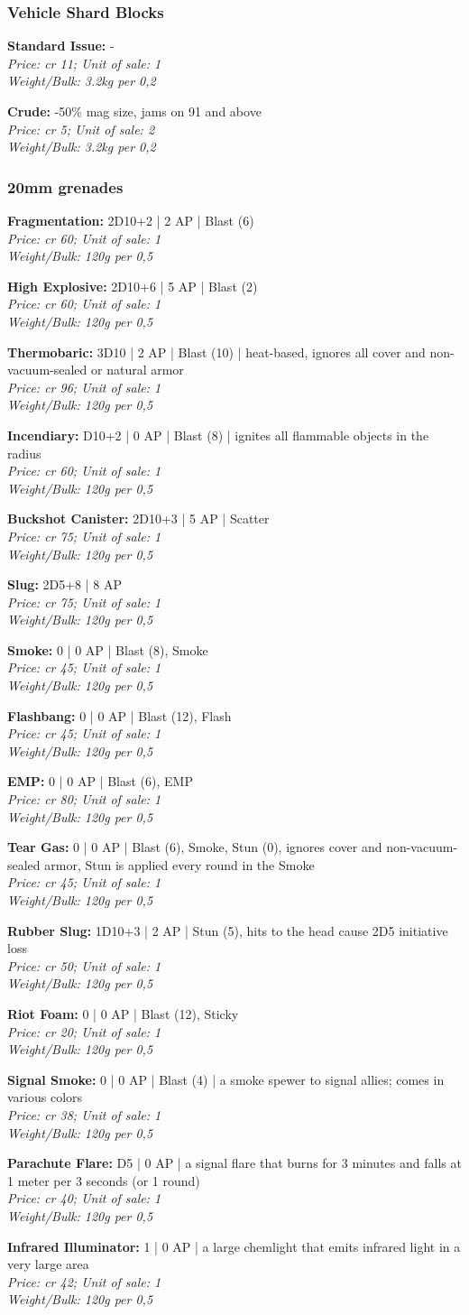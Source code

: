 \documentclass[12pt,a4paper,openany]{book}
\newcommand{\ammo}[6]{
	\begin{minipage}{\textwidth}
		\textbf{#1:} #2\\
		\textit{Price: #3; Unit of sale: #4}\\
		\textit{Weight/Bulk: #5 per #6}
	\end{minipage}
	\par
}
\begin{document}
	\subsubsection{Vehicle Shard Blocks}
	\ammo{Standard Issue}{-}{cr 11}{1}{3.2kg}{0,2}
	\ammo{Crude}{-50\% mag size, jams on 91 and above}{cr 5}{2}{3.2kg}{0,2}
	
	\subsubsection{20mm grenades}
	\ammo{Fragmentation}{2D10+2 | 2 AP | Blast (6)}{cr 60}{1}{120g}{0,5}
	\ammo{High Explosive}{2D10+6 | 5 AP | Blast (2)}{cr 60}{1}{120g}{0,5}
	\ammo{Thermobaric}{3D10 | 2 AP | Blast (10) | heat-based, ignores all cover and non-vacuum-sealed or natural armor}{cr 96}{1}{120g}{0,5}
	\ammo{Incendiary}{D10+2 | 0 AP | Blast (8) | ignites all flammable objects in the radius}{cr 60}{1}{120g}{0,5}
	\ammo{Buckshot Canister}{2D10+3 | 5 AP | Scatter}{cr 75}{1}{120g}{0,5}
	\ammo{Slug}{2D5+8 | 8 AP}{cr 75}{1}{120g}{0,5}
	\ammo{Smoke}{0 | 0 AP | Blast (8), Smoke}{cr 45}{1}{120g}{0,5}
	\ammo{Flashbang}{0 | 0 AP | Blast (12), Flash}{cr 45}{1}{120g}{0,5}
	\ammo{EMP}{0 | 0 AP | Blast (6), EMP}{cr 80}{1}{120g}{0,5}
	\ammo{Tear Gas}{0 | 0 AP | Blast (6), Smoke, Stun (0), ignores cover and non-vacuum-sealed armor, Stun is applied every round in the Smoke}{cr 45}{1}{120g}{0,5}
	\ammo{Rubber Slug}{1D10+3 | 2 AP | Stun (5), hits to the head cause 2D5 initiative loss}{cr 50}{1}{120g}{0,5}
	\ammo{Riot Foam}{0 | 0 AP | Blast (12), Sticky}{cr 20}{1}{120g}{0,5}
	\ammo{Signal Smoke}{0 | 0 AP | Blast (4) | a smoke spewer to signal allies; comes in various colors}{cr 38}{1}{120g}{0,5}
	\ammo{Parachute Flare}{D5 | 0 AP | a signal flare that burns for 3 minutes and falls at 1 meter per 3 seconds (or 1 round)}{cr 40}{1}{120g}{0,5}
	\ammo{Infrared Illuminator}{1 | 0 AP | a large chemlight that emits infrared light in a very large area}{cr 42}{1}{120g}{0,5}
\end{document}
